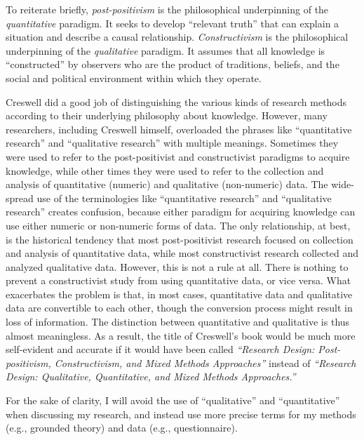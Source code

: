 To reiterate briefly, \textit{post-positivism} is the philosophical underpinning of the \textit{quantitative} paradigm. It seeks to develop ``relevant truth'' that can explain a situation and describe a causal relationship. 
\textit{Constructivism} is the philosophical underpinning of the \textit{qualitative} paradigm. It assumes that all knowledge is ``constructed'' by observers who are the product of traditions, beliefs, and the social and political environment within which they operate. 

Creswell did a good job of distinguishing the various kinds of research methods according to their underlying philosophy about knowledge. However, many researchers, including Creswell himself, overloaded the phrases like ``quantitative research'' and ``qualitative research'' with multiple meanings. Sometimes they were used to refer to the post-positivist and constructivist paradigms to acquire knowledge, while other times they were used to refer to the collection and analysis of quantitative (numeric) and qualitative (non-numeric) data. 
The wide-spread use of the terminologies like ``quantitative research'' and ``qualitative research'' creates confusion, because either paradigm for acquiring knowledge can use either numeric or non-numeric forms of data. 
The only relationship, at best, is the historical tendency that most post-positivist research focused on collection and analysis of quantitative data, while most constructivist research collected and analyzed qualitative data. 
However, this is not a rule at all. There is nothing to prevent a constructivist study from using quantitative data, or vice versa.
What exacerbates the problem is that, in most cases, quantitative data and qualitative data are convertible to each other, though the conversion process might result in loss of information. The distinction between quantitative and qualitative is thus almost meaningless. As a result, the title of Creswell's book \cite{Creswell:2003} would be much more self-evident and accurate if it would have been called \textit{``Research Design: Post-positivism, Constructivism, and Mixed Methods Approaches''} instead of \textit{``Research Design: Qualitative, Quantitative, and Mixed Methods Approaches.''}

For the sake of clarity, I will avoid the use of ``qualitative'' and ``quantitative'' when discussing my research, and instead use more precise terms for my methods (e.g., grounded theory) and data (e.g., questionnaire).


